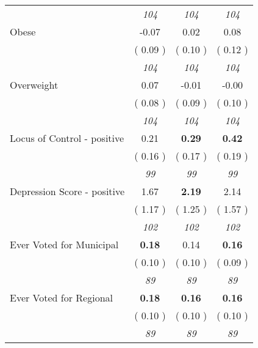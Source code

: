 \begin{tabular}{l c c c}
& \textit{ 104 } & \textit{ 104 } & \textit{ 104 } \\
Obese &     -0.07 &      0.02 &      0.08 \\
& (     0.09 ) & (     0.10 ) & (     0.12 ) \\
& \textit{ 104 } & \textit{ 104 } & \textit{ 104 } \\
Overweight &      0.07 &     -0.01 &     -0.00 \\
& (     0.08 ) & (     0.09 ) & (     0.10 ) \\
& \textit{ 104 } & \textit{ 104 } & \textit{ 104 } \\
Locus of Control - positive &      0.21 & \textbf{      0.29 } & \textbf{      0.42 } \\
& (     0.16 ) & (     0.17 ) & (     0.19 ) \\
& \textit{ 99 } & \textit{ 99 } & \textit{ 99 } \\
Depression Score - positive &      1.67 & \textbf{      2.19 } &      2.14 \\
& (     1.17 ) & (     1.25 ) & (     1.57 ) \\
& \textit{ 102 } & \textit{ 102 } & \textit{ 102 } \\
Ever Voted for Municipal & \textbf{      0.18 } &      0.14 & \textbf{      0.16 } \\
& (     0.10 ) & (     0.10 ) & (     0.09 ) \\
& \textit{ 89 } & \textit{ 89 } & \textit{ 89 } \\
Ever Voted for Regional & \textbf{      0.18 } & \textbf{      0.16 } & \textbf{      0.16 } \\
& (     0.10 ) & (     0.10 ) & (     0.10 ) \\
& \textit{ 89 } & \textit{ 89 } & \textit{ 89 } \\
\bottomrule
\end{tabular}
